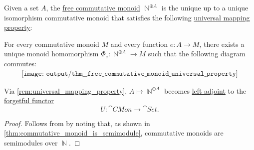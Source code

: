 \begin{theorem}\label{thm:free_commutative_monoid_universal_property}
  Given a set \( A \), the \hyperref[def:free_commutative_monoid]{free commutative monoid} \( \BbbN^{\oplus A} \) is the unique up to a unique isomorphism commutative monoid that satisfies the following \hyperref[rem:universal_mapping_property]{universal mapping property}:
  \begin{displayquote}
    For every commutative monoid \( M \) and every function \( e: A \to M \), there exists a unique monoid homomorphism \( \Phi_e: \BbbN^{\oplus A} \to M \) such that the following diagram commutes:
    \begin{equation}\label{eq:thm:free_commutative_monoid_universal_property/diagram}
      \begin{aligned}
        \texttt{[image: output/thm\_\_free\_commutative\_monoid\_universal\_property]}
      \end{aligned}
    \end{equation}
  \end{displayquote}
\end{theorem}
\begin{comments}
  \item Via \cref{rem:universal_mapping_property}, \( A \mapsto \BbbN^{\oplus A} \) becomes \hyperref[def:category_adjunction]{left adjoint} to the \hyperref[def:concrete_category]{forgetful functor}
  \begin{equation*}
    U: \cat{CMon} \to \cat{Set}.
  \end{equation*}
\end{comments}
\begin{proof}
  Follows from  by noting that, as shown in \cref{thm:commutative_monoid_is_semimodule}, commutative monoids are semimodules over \( \BbbN \).
\end{proof}
